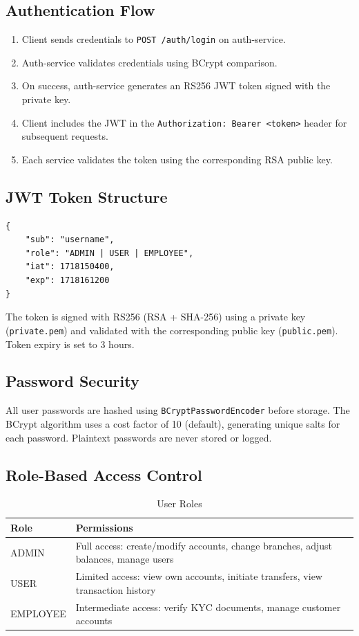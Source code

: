 \documentclass[12pt,a4paper]{report}
\begin{document}
\subsection{Authentication Flow}
\begin{enumerate}
    \item Client sends credentials to \texttt{POST /auth/login} on auth-service.
    \item Auth-service validates credentials using BCrypt comparison.
    \item On success, auth-service generates an RS256 JWT token signed with the private key.
    \item Client includes the JWT in the \texttt{Authorization: Bearer <token>} header for subsequent requests.
    \item Each service validates the token using the corresponding RSA public key.
\end{enumerate}

\subsection{JWT Token Structure}
\begin{lstlisting}[style=jsonstyle, caption={JWT Claims}]
{
    "sub": "username",
    "role": "ADMIN | USER | EMPLOYEE",
    "iat": 1718150400,
    "exp": 1718161200
}
\end{lstlisting}

The token is signed with RS256 (RSA + SHA-256) using a private key (\texttt{private.pem}) and validated with the corresponding public key (\texttt{public.pem}). Token expiry is set to 3 hours.

\subsection{Password Security}
All user passwords are hashed using \texttt{BCryptPasswordEncoder} before storage. The BCrypt algorithm uses a cost factor of 10 (default), generating unique salts for each password. Plaintext passwords are never stored or logged.

\subsection{Role-Based Access Control}
\begin{table}[H]
\centering
\caption{User Roles}
\begin{tabularx}{\textwidth}{lX}
\toprule
\textbf{Role} & \textbf{Permissions} \\
\midrule
ADMIN & Full access: create/modify accounts, change branches, adjust balances, manage users \\
USER & Limited access: view own accounts, initiate transfers, view transaction history \\
EMPLOYEE & Intermediate access: verify KYC documents, manage customer accounts \\
\bottomrule
\end{tabularx}
\end{table}
\end{document}
